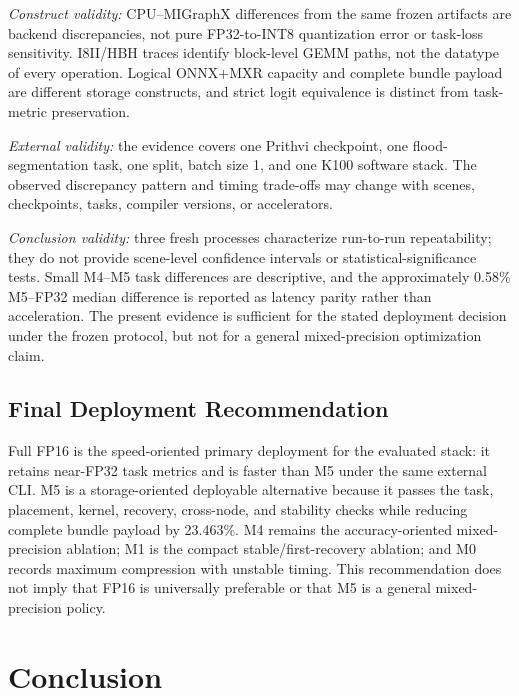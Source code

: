 \documentclass[conference]{IEEEtran}
\begin{document}
\textit{Construct validity:} CPU--MIGraphX differences from the same frozen artifacts are backend discrepancies, not pure FP32-to-INT8 quantization error or task-loss sensitivity. I8II/HBH traces identify block-level GEMM paths, not the datatype of every operation. Logical ONNX+MXR capacity and complete bundle payload are different storage constructs, and strict logit equivalence is distinct from task-metric preservation.

\textit{External validity:} the evidence covers one Prithvi checkpoint, one flood-segmentation task, one split, batch size 1, and one K100 software stack. The observed discrepancy pattern and timing trade-offs may change with scenes, checkpoints, tasks, compiler versions, or accelerators.

\textit{Conclusion validity:} three fresh processes characterize run-to-run repeatability; they do not provide scene-level confidence intervals or statistical-significance tests. Small M4--M5 task differences are descriptive, and the approximately 0.58\% M5--FP32 median difference is reported as latency parity rather than acceleration. The present evidence is sufficient for the stated deployment decision under the frozen protocol, but not for a general mixed-precision optimization claim.

\subsection{Final Deployment Recommendation}

Full FP16 is the speed-oriented primary deployment for the evaluated stack: it retains near-FP32 task metrics and is faster than M5 under the same external CLI. M5 is a storage-oriented deployable alternative because it passes the task, placement, kernel, recovery, cross-node, and stability checks while reducing complete bundle payload by 23.463\%. M4 remains the accuracy-oriented mixed-precision ablation; M1 is the compact stable/first-recovery ablation; and M0 records maximum compression with unstable timing. This recommendation does not imply that FP16 is universally preferable or that M5 is a general mixed-precision policy.

\section{Conclusion}
\end{document}
